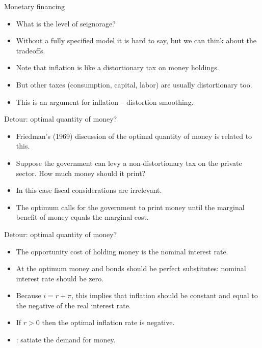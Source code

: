 \documentclass[11pt,xcolor={dvipsnames},aspectratio=159,hyperref={pdftex,pdfpagemode=UseNone,hidelinks,pdfdisplaydoctitle=true},usepdftitle=false]{beamer}
\begin{document}
\begin{frame}{Monetary financing}
    \begin{itemize}
    \item What is the  level of seignorage? 
    \item Without a fully specified model it is hard to say, but we can think about the tradeoffs.
    \item Note that inflation is like a distortionary tax on money holdings.
    \item But other taxes (consumption, capital, labor) are usually distortionary too.
    \item This is an argument for  inflation -- distortion smoothing.
    \end{itemize}
\end{frame}

\begin{frame}{Detour: optimal quantity of money?}
    \begin{itemize}
    \item Friedman's (1969) discussion of the optimal quantity of money is related to this. 
    \item Suppose the government can levy a non-distortionary tax on the private sector. How much money should it print?
    \item In this case fiscal considerations are irrelevant.  
    \item The optimum calls for the government to print money until the marginal benefit of money equals the marginal cost.
    \end{itemize}
\end{frame}

\begin{frame}{Detour: optimal quantity of money?}
    \begin{itemize}
    \item The opportunity cost of holding money is the nominal interest rate.
    \item At the optimum money and bonds should be perfect substitutes: nominal interest rate should be zero.
    \item Because $i = r + \pi$, this implies that inflation should be constant and equal to the negative of the real interest rate.
    \item If $r>0$ then the optimal inflation rate is negative. 
    \item {}: satiate the demand for money.
    \end{itemize}
\end{frame}
\end{document}
